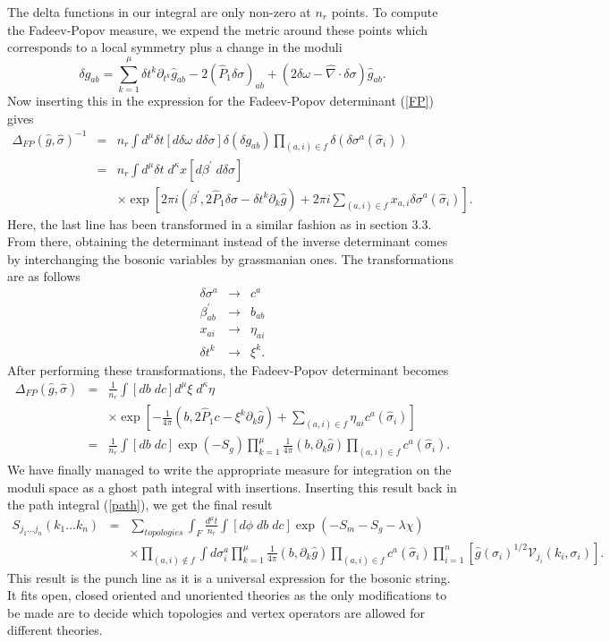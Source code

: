 \documentclass[12pt,letterpaper]{article}
\def\be{\begin{equation}}
\def\ee{\end{equation}}
\def\bear{\begin{eqnarray}}
\def\eear{\end{eqnarray}}
\def\nn{\nonumber}
\begin{document}
The delta functions in our integral are only non-zero at $n_{r}$ points.  To compute the Fadeev-Popov measure, we expend the metric around these points which corresponds to a local symmetry plus a change in the moduli
\be
\delta g_{ab}=\sum_{k=1}^{\mu}\delta t^{k}\partial_{t^{k}}\hat{g}_{ab}-2(\hat{P}_{1}\delta\sigma)_{ab}+(2\delta\omega-\hat{\nabla}\cdot \delta\sigma)\hat{g}_{ab}.
\ee
Now inserting this in the expression for the Fadeev-Popov determinant (\ref{FP}) gives 
\bear
\Delta_{FP}(\hat{g},\hat{\sigma})^{-1}&=&n_{r}\int d^{\mu}\delta t[d\delta\omega\;d\delta\sigma]\delta(\delta g_{ab})\prod_{(a,i)\in f}\delta(\delta\sigma^{a}(\hat{\sigma}_{i}))\nn\\
&=& n_{r}\int d^{\mu}\delta t\;d^{\kappa}x[d\beta^{\prime}\;d\delta\sigma]\nn\\
&&\times \exp\left[2\pi i(\beta^{\prime},2\hat{P}_{1}\delta\sigma-\delta t^{k}\partial_{k}\hat{g})+2\pi i\sum_{(a,i)\in f}x_{a,i}\delta\sigma^{a}(\hat{\sigma}_{i})\right].
\eear
Here, the last line has been transformed in a similar fashion as in section 3.3.  From there, obtaining the determinant instead of the inverse determinant comes by interchanging the bosonic variables by grassmanian ones.  The transformations are as follows
\bear
\delta\sigma^{a}&\rightarrow& c^{a}\nn\\
\beta^{\prime}_{ab}&\rightarrow& b_{ab}\nn\\
x_{ai}&\rightarrow&\eta_{ai}\nn\\
\delta t^{k}&\rightarrow&\xi^{k}.
\eear
After performing these transformations, the Fadeev-Popov determinant becomes
\bear
\Delta_{FP}(\hat{g},\hat{\sigma})&=&\frac{1}{n_{r}}\int [db\;dc]d^{\mu}\xi\;d^{\kappa}\eta\nn\\
&&\times \exp\left[-\frac{1}{4\pi}(b,2\hat{P}_{1}c-\xi^{k}\partial_{k}\hat{g})+\sum_{(a,i)\in f}\eta_{ai}c^{a}(\hat{\sigma}_{i})\right]\nn\\
&=&\frac{1}{n_{r}}\int [db\;dc]\exp(-S_{g})\prod_{k=1}^{\mu}\frac{1}{4\pi}(b,\partial_{k}\hat{g})\prod_{(a,i)\in f}c^{a}(\hat{\sigma}_{i}).
\eear
We have finally managed to write the appropriate measure for integration on the moduli space as a ghost path integral with insertions.  Inserting this result back in the path integral (\ref{path}), we get the final result
\bear
S_{j_{1}...j_{n}}(k_{1}...k_{n})&=&\sum_{topologies}\int_{F}\frac{d^{\mu}t}{n_{r}}\int [d\phi\;db\;dc]\exp(-S_{m}-S_{g}-\lambda\chi)\nn\\
&&\times \prod_{(a,i)\not\in f}\int d\sigma_{i}^{a}\prod_{k=1}^{\mu}\frac{1}{4\pi}(b,\partial_{k}\hat{g})\prod_{(a,i)\in f}c^{a}(\hat{\sigma}_{i})\prod_{i=1}^{n}\left[\hat{g}(\sigma_{i})^{1/2}\mathcal{V}_{j_{i}}(k_{i},\sigma_{i})\right].
\eear
This result is the punch line as it is a universal expression for the bosonic string.  It fits open, closed oriented and unoriented theories as the only modifications to be made are to decide which topologies and vertex operators are allowed for different theories.  
\end{document}
